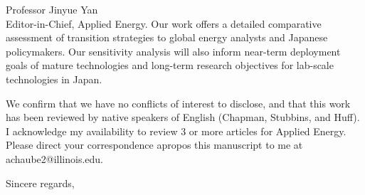 \documentclass[10pt]{letter} %
\begin{document}
\begin{letter}{Professor Jinyue Yan\\
Editor-in-Chief, Applied Energy.}
Our work offers a detailed comparative assessment of transition strategies to global energy analysts and Japanese policymakers. Our sensitivity analysis will also inform near-term deployment goals of mature technologies and long-term research objectives for lab-scale technologies in Japan.

We confirm that we have no conflicts of interest to disclose, and that this work has been reviewed by native speakers of English (Chapman, Stubbins, and Huff). I acknowledge my availability to review 3 or more articles for Applied Energy. Please direct your correspondence apropos this manuscript to me at achaube2@illinois.edu. 

\closing{Sincere regards,\\
}


\end{letter}
\end{document}
